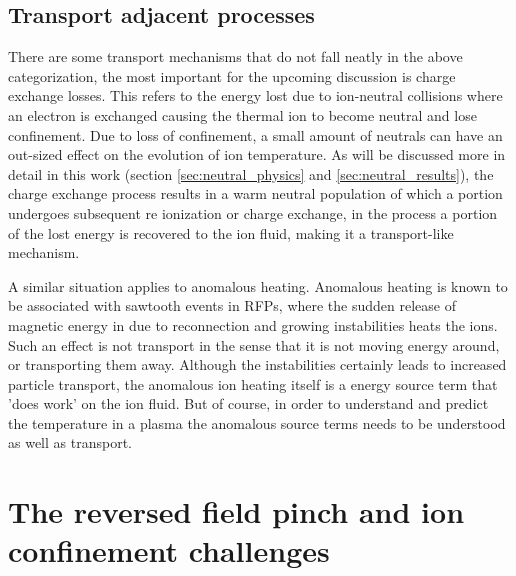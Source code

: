 \begin{refsection}
\subsection{Transport adjacent processes}

There are some transport mechanisms that do not fall neatly in the above categorization, the most important for the upcoming discussion is charge exchange losses. This refers to the energy lost due to ion-neutral collisions where an electron is exchanged causing the thermal ion to become neutral and lose confinement. Due to loss of confinement, a small amount of neutrals can have an out-sized effect on the evolution of ion temperature. As will be discussed more in detail in this work (section \ref{sec:neutral_physics} and \ref{sec:neutral_results}), the charge exchange process results in a warm neutral population of which a portion undergoes subsequent re ionization or charge exchange, in the process a portion of the lost energy is recovered to the ion fluid, making it a transport-like mechanism.

A similar situation applies to anomalous heating. Anomalous heating is known to be associated with sawtooth events in RFPs, where the sudden release of magnetic energy in due to reconnection and growing instabilities heats the ions. Such an effect is not transport in the sense that it is not moving energy around, or transporting them away. Although the instabilities certainly leads to increased particle transport, the anomalous ion heating itself is a energy source term that 'does work' on the ion fluid. But of course, in order to understand and predict the temperature in a plasma the anomalous source terms needs to be understood as well as transport. 

\section{The reversed field pinch and ion confinement challenges}


\end{refsection}
